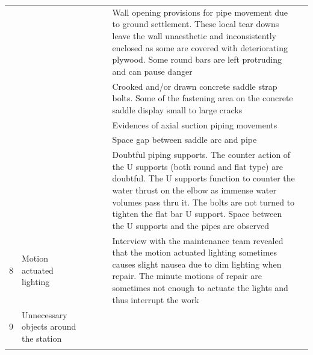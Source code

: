 \begin{table}[h]
{{\begin{tabular}{c|p{2.5cm}|c|c|c|p{6cm}|p{1cm}}
	&  &  &  &  & Wall opening provisions for pipe movement due to ground settlement. These local tear downs leave the wall unaesthetic and inconsistently enclosed as some are covered with deteriorating plywood. Some round bars are left protruding and can pause danger &  \\ 
	&  &  &  &  & Crooked and/or drawn concrete saddle strap bolts. Some of the fastening area on the concrete saddle display small to large cracks &  \\ 
	&  &  &  &  & Evidences of axial suction piping movements &  \\ 
	&  &  &  &  & Space gap between saddle arc and pipe &  \\ 
	&  &  &  &  & Doubtful piping supports. The counter action of the U supports (both round and flat type) are doubtful. The U supports function to counter the water thrust on the elbow as immense water volumes pass thru it. The bolts are not turned to tighten the flat bar U support. Space between the U supports and the pipes are observed &  \\ 
	8 & Motion actuated lighting &  &  &  & Interview with the maintenance team revealed that the motion actuated lighting sometimes causes slight nausea due to dim lighting when repair. The minute motions of repair are sometimes not enough to actuate the lights and thus interrupt the work &  \\ 
	9 & Unnecessary objects around the station &  &  &  &  &  \\ 
	&  &  &  &  &  &  \\ 
	\hline
\end{tabular}	
	}}
\end{table}





